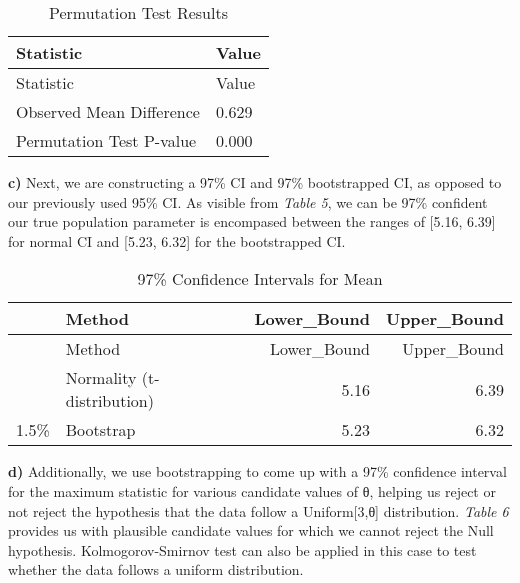 \documentclass[
]{article}
\begin{document}
\begin{longtable}[]{@{}ll@{}}
\caption{Permutation Test Results}\tabularnewline
\toprule\noalign{}
Statistic & Value \\
\midrule\noalign{}
\endfirsthead
\toprule\noalign{}
Statistic & Value \\
\midrule\noalign{}
\endhead
\bottomrule\noalign{}
\endlastfoot
Observed Mean Difference & 0.629 \\
Permutation Test P-value & 0.000 \\
\end{longtable}

\textbf{c)} Next, we are constructing a 97\% CI and 97\% bootstrapped
CI, as opposed to our previously used 95\% CI. As visible from
\emph{Table 5}, we can be 97\% confident our true population parameter
is encompased between the ranges of {[}5.16, 6.39{]} for normal CI and
{[}5.23, 6.32{]} for the bootstrapped CI.

\begin{longtable}[]{@{}llrr@{}}
\caption{97\% Confidence Intervals for Mean}\tabularnewline
\toprule\noalign{}
& Method & Lower\_Bound & Upper\_Bound \\
\midrule\noalign{}
\endfirsthead
\toprule\noalign{}
& Method & Lower\_Bound & Upper\_Bound \\
\midrule\noalign{}
\endhead
\bottomrule\noalign{}
\endlastfoot
& Normality (t-distribution) & 5.16 & 6.39 \\
1.5\% & Bootstrap & 5.23 & 6.32 \\
\end{longtable}

\textbf{d)} Additionally, we use bootstrapping to come up with a 97\%
confidence interval for the maximum statistic for various candidate
values of θ, helping us reject or not reject the hypothesis that the
data follow a Uniform{[}3,θ{]} distribution. \emph{Table 6} provides us
with plausible candidate values for which we cannot reject the Null
hypothesis. Kolmogorov-Smirnov test can also be applied in this case to
test whether the data follows a uniform distribution.
\end{document}
